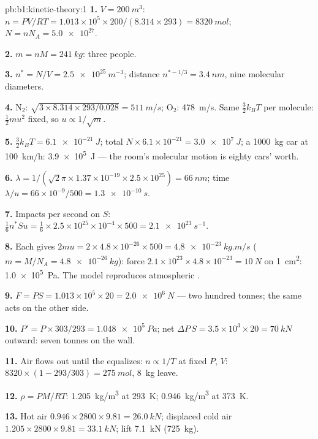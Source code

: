 \begin{solution}{pb:b1:kinetic-theory:1}
\textbf{1.} $V = \qty{200}{m^3}$: $n = PV/RT = 1.013\times10^5 \times 200/(8.314
\times 293) = \qty{8320}{mol}$; $N = nN_A = \num{5.0e27}$.

\textbf{2.} $m = nM = \qty{241}{kg}$: three people.

\textbf{3.} $n^* = N/V = \qty{2.5e25}{m^{-3}}$; distance $n^{*-1/3} = \qty{3.4}{nm}$,
nine molecular diameters.

\textbf{4.} N$_2$: $\sqrt{3 \times 8.314 \times 293/0.028} = \qty{511}{m/s}$;
O$_2$: \qty{478}{m/s}. Same $\tfrac32 k_BT$ per molecule: $\tfrac12 mu^2$ fixed,
so $u \propto 1/\sqrt m$.

\textbf{5.} $\tfrac32 k_BT = \qty{6.1e-21}{J}$; total $N \times 6.1\times10^{-21}
= \qty{3.0e7}{J}$; a \qty{1000}{kg} car at \qty{100}{km/h}: \qty{3.9e5}{J} ---
the room's molecular motion is eighty cars' worth.

\textbf{6.} $\lambda = 1/(\sqrt2\pi \times 1.37\times10^{-19} \times 2.5\times10^{25})
= \qty{66}{nm}$; time $\lambda/u = 66\times10^{-9}/500 = \qty{1.3e-10}{s}$.

\textbf{7.} Impacts per second on $S$: $\tfrac16 n^*Su = \tfrac16 \times 2.5\times
10^{25} \times 10^{-4} \times 500 = \qty{2.1e23}{s^{-1}}$.

\textbf{8.} Each gives $2mu = 2 \times 4.8\times10^{-26} \times 500 = \qty{4.8e-23}{kg.m/s}$
($m = M/N_A = \qty{4.8e-26}{kg}$): force $2.1\times10^{23} \times 4.8\times10^{-23}
= \qty{10}{N}$ on \qty{1}{cm^2}: \qty{1.0e5}{Pa}. The model reproduces
atmospheric .

\textbf{9.} $F = PS = 1.013\times10^5 \times 20 = \qty{2.0e6}{N}$ --- two hundred
tonnes; the same  acts on the other side.

\textbf{10.} $P' = P \times 303/293 = \qty{1.048e5}{Pa}$; net $\Delta P\,S = 3.5
\times10^3 \times 20 = \qty{70}{kN}$ outward: seven tonnes on the wall.

\textbf{11.} Air flows out until the  equalizes: $n \propto 1/T$ at
fixed $P$, $V$: $8320 \times (1 - 293/303) = \qty{275}{mol}$, \qty{8}{kg}
leave.

\textbf{12.} $\rho = PM/RT$: \qty{1.205}{kg/m^3} at \qty{293}{K}; \qty{0.946}{kg/m^3}
at \qty{373}{K}.

\textbf{13.} Hot air $0.946 \times 2800 \times 9.81 = \qty{26.0}{kN}$; displaced
cold air $1.205 \times 2800 \times 9.81 = \qty{33.1}{kN}$; lift \qty{7.1}{kN}
(\qty{725}{kg}).


\end{solution}
